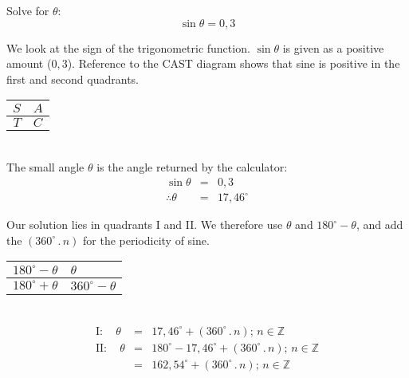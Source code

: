 \begin{wex}{}
{
Solve for $\theta$: 
\[\sin \theta = 0,3 \]
}
{
\begin{minipage}{0.7\textwidth}
We look at the sign of the trigonometric function. $\sin\theta$ is given as a positive amount ($0,3$). Reference to the CAST diagram shows that sine is positive in the first and second quadrants.
\end{minipage}
\begin{minipage}{0.3\textwidth}
\begin{center}
\begin{tabular}{r|l}
$S$ & $A$ \\
\hline
$T$ & $C$ 
\end{tabular}
\end{center}
\end{minipage}\\

The small angle $\theta$ is the angle returned by the calculator:
\begin{eqnarray*}
\sin \theta &= &0,3\\
\therefore \theta &=& 17,46^\circ
\end{eqnarray*}

\begin{minipage}{0.65\textwidth}
Our solution lies in quadrants I and II. We therefore use $\theta$ and $180^\circ - \theta$, and add the $(360^{\circ}\,.\, n)$ for the periodicity of sine.
\end{minipage}
\begin{minipage}{0.35\textwidth}
\begin{center}
\footnotesize
\begin{tabular}{r|l}
 $180^{\circ} - \theta$ & $\theta$ \\
\hline
 $180^{\circ} + \theta$ & $360^{\circ} - \theta$ 
\end{tabular}
\normalsize
\end{center}
\end{minipage}\\
\begin{eqnarray*}
\mathrm{I:} \quad \theta &=& 17,46^{\circ} + (360^{\circ}\,.\, n)\mbox{; } n \in \mathbb{Z}  \\
\mathrm{II:} \quad \theta &=& 180^{\circ} - 17,46^{\circ} + (360^{\circ}\,.\, n) \mbox{; } n \in \mathbb{Z} \\
&=& 162,54^{\circ} + (360^{\circ}\,.\, n) \mbox{; } n \in \mathbb{Z}
\end{eqnarray*}

}
\end{wex}

